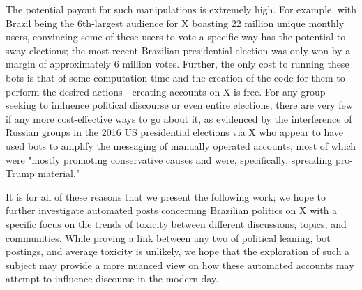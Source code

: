 \documentclass[a4paper,11pt]{article}  %
\begin{document}
	The potential payout for such manipulations is extremely high. For example, with Brazil being the 6th-largest audience for X boasting 22 million unique monthly users\parencite{TwitterGlobalAudience}, convincing some of these users to vote a specific way has the potential to sway elections; the most recent Brazilian presidential election was only won by a margin of approximately 6 million votes\parencite{SIGEleicaoResultados}. Further, the only cost to running these bots is that of some computation time and the creation of the code for them to perform the desired actions - creating accounts on X is free. For any group seeking to influence political discourse or even entire elections, there are very few if any more cost-effective ways to go about it, as evidenced by the interference of Russian groups in the 2016 US presidential elections via X who appear to have used bots to amplify the messaging of manually operated accounts, most of which were "mostly promoting conservative causes and were, specifically, spreading pro-Trump material."\parencite{badawyAnalyzingDigitalTraces2018}
	
	It is for all of these reasons that we present the following work; we hope to further investigate automated posts concerning Brazilian politics on X with a specific focus on the trends of toxicity between different discussions, topics, and communities. While proving a link between any two of political leaning, bot postings, and average toxicity is unlikely, we hope that the exploration of such a subject may provide a more nuanced view on how these automated accounts may attempt to influence discourse in the modern day.
\end{document}
